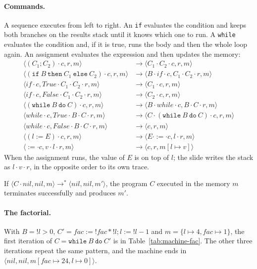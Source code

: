 \paragraph{Commands.} A sequence executes from left to right. An \texttt{if}
evaluates the condition and keeps both branches on the results stack until
it knows which one to run. A \texttt{while} evaluates the condition and, if it
is true, runs the body and then the whole loop again. An assignment evaluates
the expression and then updates the memory:
\[
\begin{array}{ll}
\langle (C_1 ; C_2) \cdot c, r, m \rangle & \to \langle C_1 \cdot C_2 \cdot c, r, m \rangle \\
\langle (\mathtt{if}\ B\ \mathtt{then}\ C_1\ \mathtt{else}\ C_2) \cdot c, r, m \rangle & \to \langle B \cdot \mathit{if} \cdot c, C_1 \cdot C_2 \cdot r, m \rangle \\
\langle \mathit{if} \cdot c, \mathit{True} \cdot C_1 \cdot C_2 \cdot r, m \rangle & \to \langle C_1 \cdot c, r, m \rangle \\
\langle \mathit{if} \cdot c, \mathit{False} \cdot C_1 \cdot C_2 \cdot r, m \rangle & \to \langle C_2 \cdot c, r, m \rangle \\
\langle (\mathtt{while}\ B\ \mathtt{do}\ C) \cdot c, r, m \rangle & \to \langle B \cdot \mathit{while} \cdot c, B \cdot C \cdot r, m \rangle \\
\langle \mathit{while} \cdot c, \mathit{True} \cdot B \cdot C \cdot r, m \rangle & \to \langle C \cdot (\mathtt{while}\ B\ \mathtt{do}\ C) \cdot c, r, m \rangle \\
\langle \mathit{while} \cdot c, \mathit{False} \cdot B \cdot C \cdot r, m \rangle & \to \langle c, r, m \rangle \\
\langle (l := E) \cdot c, r, m \rangle & \to \langle E \cdot {:=} \cdot c, l \cdot r, m \rangle \\
\langle {:=} \cdot c, v \cdot l \cdot r, m \rangle & \to \langle c, r, m[l \mapsto v] \rangle
\end{array}
\]
When the assignment runs, the value of $E$ is on top of $l$; the slide writes
the stack as $l \cdot v \cdot r$, in the opposite order to its own trace.

If $\langle C \cdot \mathit{nil}, \mathit{nil}, m \rangle \to^* \langle \mathit{nil}, \mathit{nil}, m' \rangle$, the
program $C$ executed in the memory $m$ terminates successfully and produces
$m'$.

\paragraph{The factorial.} With $B = !l > 0$, $C' = \mathit{fac} := !\mathit{fac} * !l ; l := !l - 1$
and $m = \{l \mapsto 4, \mathit{fac} \mapsto 1\}$, the first iteration of
$C = \mathtt{while}\ B\ \mathtt{do}\ C'$ is in Table~\ref{tab:machine-fac}. The other three
iterations repeat the same pattern, and the machine ends in
$\langle \mathit{nil}, \mathit{nil}, m[\mathit{fac} \mapsto 24, l \mapsto 0] \rangle$.

